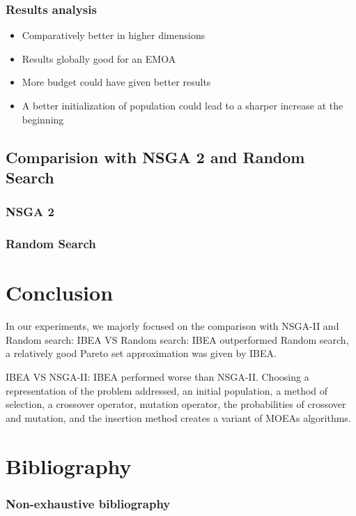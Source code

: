 \documentclass{beamer}
\begin{document}
\begin{frame}
  \frametitle{Results analysis}
  \begin{itemize}
  \item Comparatively better in higher dimensions
  \item Results globally good for an EMOA
  \end{itemize}
  \begin{itemize}
  \item More budget could have given better results
  \item A better initialization of population could lead to a sharper increase
    at the beginning
  \end{itemize}
\end{frame}

\subsection{Comparision with NSGA 2 and Random Search}
\begin{frame}
\frametitle{NSGA 2}

\end{frame}

\begin{frame}
\frametitle{Random Search}

\end{frame}

\section{Conclusion}
\begin{frame}
In our experiments, we majorly focused on the
comparison with NSGA-II and Random search:
\vskip 0.1in
IBEA VS Random search: IBEA outperformed Random search, a relatively good Pareto set approximation was given by IBEA.
 
IBEA VS NSGA-II: IBEA performed worse than NSGA-II.
\vskip 0.1in
Choosing a representation of the problem
addressed, an initial population, a method of selection, a crossover operator,
mutation operator, the probabilities of crossover and mutation, and the
insertion method creates a variant of MOEAs algorithms. 
\end{frame}

\section{Bibliography}
\begin{frame}
\frametitle{Non-exhaustive bibliography}

\end{frame}
\end{document}
